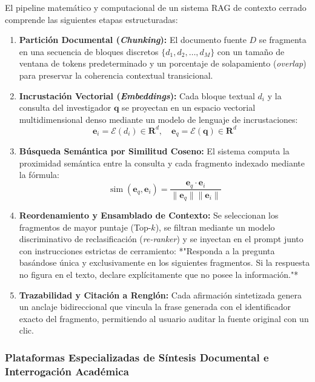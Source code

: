 El pipeline matemático y computacional de un sistema RAG de contexto cerrado comprende las siguientes etapas estructuradas:

\begin{enumerate}
    \item \textbf{Partición Documental (\textit{Chunking}):} El documento fuente $D$ se fragmenta en una secuencia de bloques discretos $\{d_1, d_2, \dots, d_M\}$ con un tamaño de ventana de tokens predeterminado y un porcentaje de solapamiento (\textit{overlap}) para preservar la coherencia contextual transicional.
    \item \textbf{Incrustación Vectorial (\textit{Embeddings}):} Cada bloque textual $d_i$ y la consulta del investigador $\mathbf{q}$ se proyectan en un espacio vectorial multidimensional denso mediante un modelo de lenguaje de incrustaciones:
    \begin{equation}
        \mathbf{e}_i = \mathcal{E}(d_i) \in \mathbf{R}^d, \quad \mathbf{e}_q = \mathcal{E}(\mathbf{q}) \in \mathbf{R}^d
    \end{equation}
    \item \textbf{Búsqueda Semántica por Similitud Coseno:} El sistema computa la proximidad semántica entre la consulta y cada fragmento indexado mediante la fórmula:
    \begin{equation}
        \operatorname{sim}(\mathbf{e}_q, \mathbf{e}_i) = \frac{\mathbf{e}_q \cdot \mathbf{e}_i}{\|\mathbf{e}_q\| \|\mathbf{e}_i\|}
    \end{equation}
    \item \textbf{Reordenamiento y Ensamblado de Contexto:} Se seleccionan los fragmentos de mayor puntaje (Top-$k$), se filtran mediante un modelo discriminativo de reclasificación (\textit{re-ranker}) y se inyectan en el prompt junto con instrucciones estrictas de cerramiento: *"Responda a la pregunta basándose única y exclusivamente en los siguientes fragmentos. Si la respuesta no figura en el texto, declare explícitamente que no posee la información."*
    \item \textbf{Trazabilidad y Citación a Renglón:} Cada afirmación sintetizada genera un anclaje bidireccional que vincula la frase generada con el identificador exacto del fragmento, permitiendo al usuario auditar la fuente original con un clic.
\end{enumerate}

\subsubsection{Plataformas Especializadas de Síntesis Documental e Interrogación Académica}

